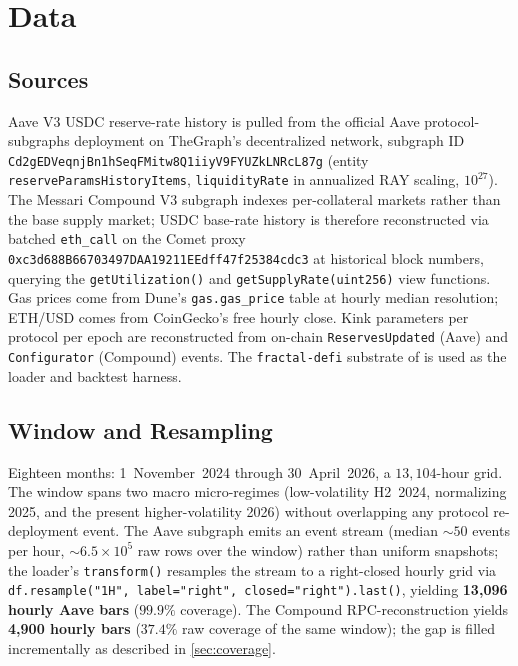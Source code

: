 \section{Data}
\label{sec:data}

\subsection{Sources}
\label{sec:data-sources}

Aave V3 USDC reserve-rate history is pulled from the official Aave
protocol-subgraphs deployment on TheGraph's decentralized network,
subgraph ID
\texttt{Cd2gEDVeqnj\-Bn1hSeqFMitw8Q1\-iiyV9FYUZkLNRcL87g}
(entity \texttt{reserveParamsHistoryItems}, \texttt{liquidityRate} in
annualized RAY scaling, $10^{27}$). The Messari Compound V3 subgraph
indexes per-collateral markets rather than the base supply market;
USDC base-rate history is therefore reconstructed via batched
\texttt{eth\_call} on the Comet proxy
\texttt{0xc3d688B66703\-497DAA19211EEdff47f25384cdc3} at historical
block numbers, querying the
\texttt{getUtilization()} and \texttt{getSupplyRate(uint256)} view
functions. Gas prices come from Dune's \texttt{gas.gas\_price} table
at hourly median resolution; ETH/USD comes from CoinGecko's free
hourly close. Kink parameters per protocol per epoch are reconstructed
from on-chain \texttt{ReservesUpdated} (Aave) and
\texttt{Configurator} (Compound) events. The \texttt{fractal-defi}
substrate of \cite{krestenko2026basis} is used as the loader and
backtest harness.

\subsection{Window and Resampling}
\label{sec:window}

Eighteen months: 1~November~2024 through 30~April~2026, a
$13{,}104$-hour grid. The window spans two macro micro-regimes
(low-volatility H2~2024, normalizing 2025, and the present
higher-volatility 2026) without overlapping any protocol
re-deployment event. The Aave subgraph emits an event stream (median
$\sim 50$ events per hour, $\sim$$6.5\times 10^{5}$ raw rows over the
window) rather than uniform snapshots; the loader's \texttt{transform()}
resamples the stream to a right-closed hourly grid via
\texttt{df.resample("1H", label="right", closed="right").last()},
yielding \textbf{13{,}096 hourly Aave bars} ($99.9\%$ coverage). The
Compound RPC-reconstruction yields \textbf{4{,}900 hourly bars}
($37.4\%$ raw coverage of the same window); the gap is filled
incrementally as described in \cref{sec:coverage}.

